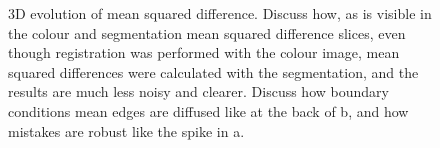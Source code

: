 \begin{figure}
    \caption{3D evolution of mean squared difference. Discuss how, as is visible in the colour and segmentation mean squared difference slices, even though registration was performed with the colour image, mean squared differences were calculated with the segmentation, and the results are much less noisy and clearer. Discuss how boundary conditions mean edges are diffused like at the back of b, and how mistakes are robust like the spike in a.}
    \label{fig:dummy_cross_sections}
  \end{figure}
  
